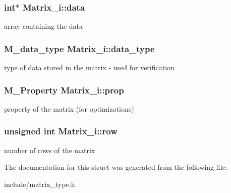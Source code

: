 \subsubsection[{\texorpdfstring{data}{data}}]{\setlength{\rightskip}{0pt plus 5cm}int$\ast$ Matrix\+\_\+i\+::data}\hypertarget{structMatrix__i_a0fe0365ed38d16792c645305c5662f53}{}\label{structMatrix__i_a0fe0365ed38d16792c645305c5662f53}
array containing the data 
\subsubsection[{\texorpdfstring{data\+\_\+type}{data_type}}]{\setlength{\rightskip}{0pt plus 5cm}M\+\_\+data\+\_\+type Matrix\+\_\+i\+::data\+\_\+type}\hypertarget{structMatrix__i_a099b6cf6ea02b60b50fafa042e48c063}{}\label{structMatrix__i_a099b6cf6ea02b60b50fafa042e48c063}
type of data stored in the matrix -\/ used for verification 
\subsubsection[{\texorpdfstring{prop}{prop}}]{\setlength{\rightskip}{0pt plus 5cm}M\+\_\+\+Property Matrix\+\_\+i\+::prop}\hypertarget{structMatrix__i_a8b30ae67887da20fe1d7fdd51ebc3ecb}{}\label{structMatrix__i_a8b30ae67887da20fe1d7fdd51ebc3ecb}
property of the matrix (for optimizations) 
\subsubsection[{\texorpdfstring{row}{row}}]{\setlength{\rightskip}{0pt plus 5cm}unsigned int Matrix\+\_\+i\+::row}\hypertarget{structMatrix__i_a9fc27d070aaebd0e2d7198a62f7b25d6}{}\label{structMatrix__i_a9fc27d070aaebd0e2d7198a62f7b25d6}
number of rows of the matrix 

The documentation for this struct was generated from the following file\+:\begin{DoxyCompactItemize}
\item 
include/matrix\+\_\+type.\+h\end{DoxyCompactItemize}

